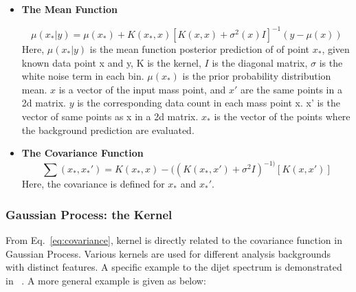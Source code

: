 
    \begin{itemize}

        \item \textbf{The Mean Function}

    \begin{equation}
        \mu(x_{*}|y)  = \mu(x_{*})+ K(x_{*}, x)[K(x, x)+ \sigma^{2}(x)I]^{-1}(y-\mu(x))
    \end{equation}
    Here, $\mu(x_{*}| y) $ is the mean function posterior prediction of of point $x_{*}$, given known data point x and y, K is the kernel, $I$ is the diagonal matrix, $\sigma$ is the white noise term in each bin. $\mu(x_{*})$ is the prior probability distribution mean. $x$ is a vector of the input mass point, and $x'$ are the same points in a 2d matrix. $y$ is the corresponding data count in each mass point x. x' is the vector of same points as x in a 2d matrix. $x_{*}$ is the vector of the points where the background prediction are evaluated.

    \item \textbf{The Covariance Function}
    \begin{equation}
        \sum(x_{*}, x_{*}') = K(x_{*}, x) - ((K(x_{*}, x')+\sigma^{2}I)^{-1)}[K(x, x')]
    \label{eq:covariance}
    \end{equation}  
    Here, the covariance is defined for $x_{*}$ and $x_{*}'$.

    \end{itemize}


    \subsubsection{Gaussian Process: the Kernel}
\label{sec:kernel}
From Eq.~\ref{eq:covariance}, kernel is directly related to the covariance function in Gaussian Process. Various kernels are used for different analysis backgrounds with distinct features. A specific example to the dijet spectrum is demonstrated in ~\cite{frate2017modeling}. A more general example is given as below:

